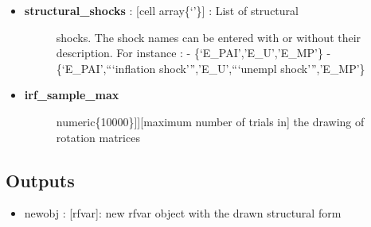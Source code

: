 \documentclass[letterpaper,10pt,english]{sphinxmanual}
\begin{document}
\begin{itemize}
\begin{itemize}
\begin{description}
\end{description}

\item {} \begin{description}
\item[{\textbf{structural\_shocks} : {[}cell array\textbar{}\{`'\}{]} : List of structural}] \leavevmode
shocks. The shock names can be entered with or without their
description. For instance :
- \{`E\_PAI','E\_U','E\_MP'\}
- \{`E\_PAI',```inflation shock''','E\_U',```unempl shock''','E\_MP'\}

\end{description}

\item {} \begin{description}
\item[{\textbf{irf\_sample\_max}}] \leavevmode{[}{[}numeric\textbar{}\{10000\}{]}{]}{[}maximum number of trials in{]}
the drawing of rotation matrices

\end{description}

\end{itemize}

\end{itemize}


\subsection{Outputs}
\label{classes/models/@rfvar/rfvar:id149}\begin{itemize}
\item {} 
newobj : {[}rfvar{]}: new rfvar object with the drawn structural form

\end{itemize}
\end{document}
